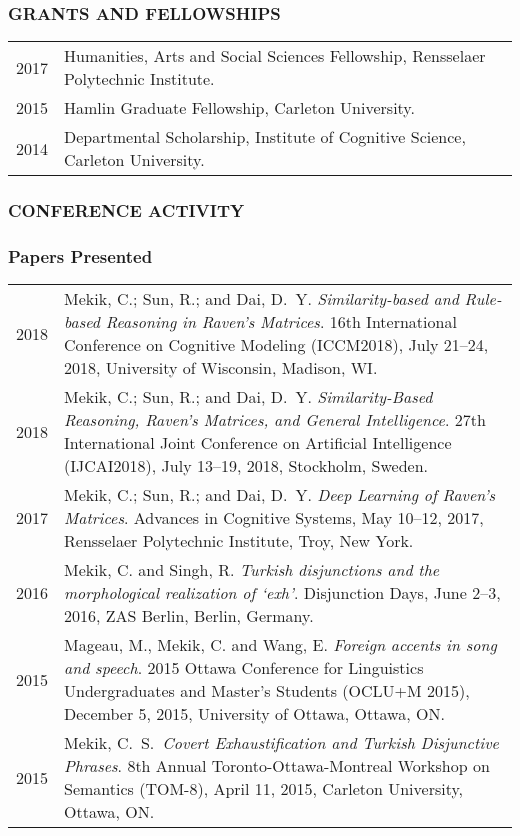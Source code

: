 \documentclass[12pt, letterpaper]{article}
\begin{document}
\subsubsection*{GRANTS AND FELLOWSHIPS}
\begin{longtable}{p{}p{}}
2017 & Humanities, Arts and Social Sciences Fellowship, Rensselaer Polytechnic Institute. \\
2015 & Hamlin Graduate Fellowship, Carleton University. \\
2014 & Departmental Scholarship, Institute of Cognitive Science, Carleton University.
\end{longtable}

\subsubsection*{CONFERENCE ACTIVITY}

\subsubsection*{Papers Presented}

\begin{longtable}{p{}p{}}
2018 & \noindent\hangindent=1cm Mekik, C.; Sun, R.; and Dai, D.\ Y. \emph{Similarity-based and Rule-based Reasoning in Raven's Matrices}. 16th International Conference on Cognitive Modeling (ICCM2018), July 21--24, 2018, University of Wisconsin, Madison, WI.\\

2018 & \noindent\hangindent=1cm Mekik, C.; Sun, R.; and Dai, D.\ Y. \emph{Similarity-Based Reasoning, Raven's Matrices, and General Intelligence}. 27th International Joint Conference on Artificial Intelligence (IJCAI2018), July 13--19, 2018, Stockholm, Sweden.\\

2017 & \noindent\hangindent=1cm Mekik, C.; Sun, R.; and Dai, D.\ Y. \emph{Deep Learning of Raven's Matrices}. Advances in Cognitive Systems, May 10--12, 2017, Rensselaer Polytechnic Institute, Troy, New York.\\

2016 & \noindent\hangindent=1cm Mekik, C. and Singh, R. \emph{Turkish disjunctions and the morphological realization of `exh'}. Disjunction Days, June 2--3, 2016, ZAS Berlin, Berlin, Germany.\\

2015 & \noindent\hangindent=1cm Mageau, M., Mekik, C. and Wang, E. \emph{Foreign accents in song and speech}. 2015 Ottawa Conference for Linguistics Undergraduates and Master's Students (OCLU+M 2015), December 5, 2015, University of Ottawa, Ottawa, ON. \\

2015 & \noindent\hangindent=1cm Mekik, C.\ S.\ \emph{Covert Exhaustification and Turkish Disjunctive Phrases}. 8th Annual Toronto-Ottawa-Montreal Workshop on Semantics (TOM-8), April 11, 2015, Carleton University, Ottawa, ON.
\end{longtable}
\end{document}
